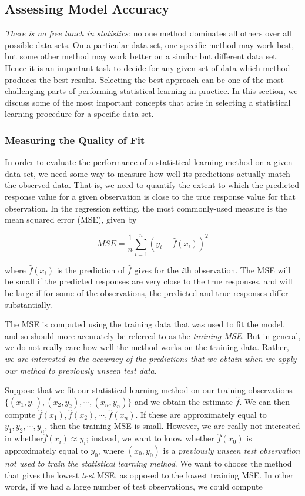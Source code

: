 \documentclass{article}
\theoremstyle{definition}
\theoremstyle{remark}
\begin{document}
\subsection*{Assessing Model Accuracy}

\textit{There is no free lunch in statistics}: no one method dominates all others over all possible data sets. On a particular data set, one specific method may work best, but some other method may work better on a similar but different data set. Hence it is an important task to decide for any given set of data which method produces the best results. Selecting the best approach can be one of the most challenging parts of performing statistical learning in practice. In this section, we discuss some of the most important concepts that arise in selecting a statistical learning procedure for a specific data set.
	
\subsubsection*{Measuring the Quality of Fit}
	In order to evaluate the performance of a statistical learning method on a given data set, we need some way to measure how well its predictions actually match the observed data. That is, we need to quantify the extent to which the predicted response value for a given observation is close to the true response value for that observation. In the regression setting, the most commonly-used measure is the mean squared error (MSE), given by
	
	\[
	MSE=\frac{1}{n}\sum^n_{i=1}(y_i-\hat{f}(x_i))^2
	\]
	
	where $\hat{f}(x_i)$ is the prediction of $\hat{f}$ gives for the \textit{i}th	 observation. The MSE will be small if the predicted responses are very close to the true responses, and will be large if for some of the observations, the predicted and true responses differ substantially.
	
	The MSE is computed using the training data that was used to fit the model, and so should more accurately be referred to as the \textit{training MSE}. But in general, we do not really care how well the method works on the training data. Rather, \textit{we are interested in the accuracy of the predictions that we obtain when we apply our method to previously unseen test data}.
	
	Suppose that we fit our statistical learning method on our training observations $\{(x_1,y_1),(x_2,y_2),\cdots,(x_n,y_n)\}$ and we obtain the estimate $\hat{f}$. We can then compute $\hat{f}(x_1),\hat{f}(x_2),\cdots,\hat{f}(x_n)$. If these are approximately equal to $y_1, y_2,\cdots,y_n$, then the training MSE is small. However, we are really not interested in whether$\hat{f}(x_i)\approx y_i$; instead, we want to know whether $\hat{f}(x_0)$ is approximately equal to $y_0$, where $(x_0, y_0)$ is a \textit{previously unseen test observation not used to train the statistical learning method}. We want to choose the method that gives the lowest \textit{test} MSE, as opposed to the lowest training MSE. In other words, if we had a large number of test observations, we could compute
	
\end{document}

